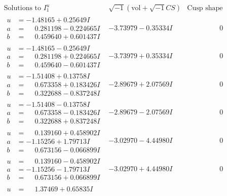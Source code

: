\documentclass[1p]{elsarticle_modified}
\theoremstyle{definition}
\newcommand{\I}{\sqrt{-1}}
\begin{document}
$$\begin{array}{c|c|c}
\text{Solutions to }I^u_{1}& \I (\text{vol} + \sqrt{-1}CS) & \text{Cusp shape}\\
 \hline 
\begin{aligned}
u &= -1.48165 + 0.25649 I \\
a &= \phantom{-}0.281198 - 0.224665 I \\
b &= \phantom{-}0.459640 + 0.601437 I\end{aligned}
 & -3.73979 - 0.35334 I & \phantom{-0.000000 } 0 \\ \hline\begin{aligned}
u &= -1.48165 - 0.25649 I \\
a &= \phantom{-}0.281198 + 0.224665 I \\
b &= \phantom{-}0.459640 - 0.601437 I\end{aligned}
 & -3.73979 + 0.35334 I & \phantom{-0.000000 } 0 \\ \hline\begin{aligned}
u &= -1.51408 + 0.13758 I \\
a &= \phantom{-}0.673358 + 0.183426 I \\
b &= \phantom{-}0.322688 - 0.837248 I\end{aligned}
 & -2.89679 + 2.07569 I & \phantom{-0.000000 } 0 \\ \hline\begin{aligned}
u &= -1.51408 - 0.13758 I \\
a &= \phantom{-}0.673358 - 0.183426 I \\
b &= \phantom{-}0.322688 + 0.837248 I\end{aligned}
 & -2.89679 - 2.07569 I & \phantom{-0.000000 } 0 \\ \hline\begin{aligned}
u &= \phantom{-}0.139160 + 0.458902 I \\
a &= -1.15256 + 1.79713 I \\
b &= \phantom{-}0.673156 - 0.066899 I\end{aligned}
 & -3.02970 - 4.44980 I & \phantom{-0.000000 } 0 \\ \hline\begin{aligned}
u &= \phantom{-}0.139160 - 0.458902 I \\
a &= -1.15256 - 1.79713 I \\
b &= \phantom{-}0.673156 + 0.066899 I\end{aligned}
 & -3.02970 + 4.44980 I & \phantom{-0.000000 } 0 \\ \hline\begin{aligned}
u &= \phantom{-}1.37469 + 0.65835 I \\

\end{aligned}
\end{array}$$
\end{document}
